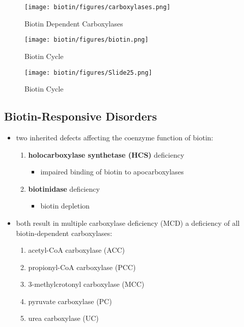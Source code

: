 \documentclass[12pt]{scrartcl}
\begin{document}
\begin{figure}[htbp]
\centering
\texttt{[image: biotin/figures/carboxylases.png]}
\caption{\label{fig:orge8d85e4}Biotin Dependent Carboxylases}
\end{figure}

\begin{figure}[htbp]
\centering
\texttt{[image: biotin/figures/biotin.png]}
\caption{\label{fig:org5b1f15c}Biotin Cycle}
\end{figure}

\begin{figure}[htbp]
\centering
\texttt{[image: biotin/figures/Slide25.png]}
\caption{\label{fig:org39654d1}Biotin Cycle}
\end{figure}

\subsection{Biotin-Responsive Disorders}
\label{sec:org37b1334}
\begin{itemize}
\item two inherited defects affecting the coenzyme function of biotin:
\begin{enumerate}
\item \textbf{holocarboxylase synthetase (HCS)} deficiency
\begin{itemize}
\item impaired binding of biotin to apocarboxylases
\end{itemize}
\item \textbf{biotinidase} deficiency
\begin{itemize}
\item biotin depletion
\end{itemize}
\end{enumerate}

\item both result in multiple carboxylase deficiency (MCD) a deficiency of
all biotin-dependent carboxylases:
\begin{enumerate}
\item acetyl-CoA carboxylase (ACC)
\item propionyl-CoA carboxylase (PCC)
\item 3-methylcrotonyl carboxylase (MCC)
\item pyruvate carboxylase (PC)
\item urea carboxylase (UC)
\end{enumerate}
\end{itemize}
\end{document}
